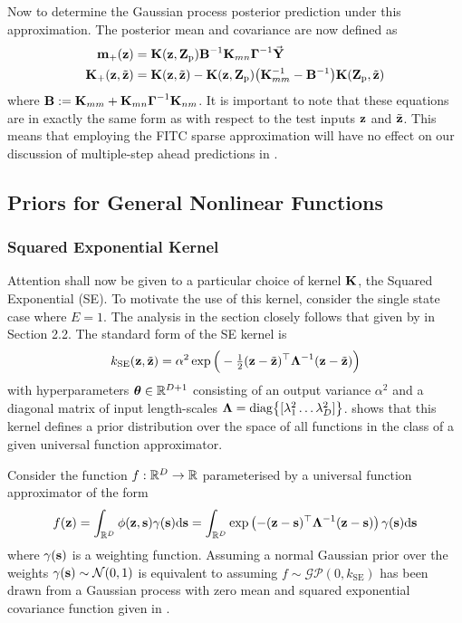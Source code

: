 Now to determine the Gaussian process posterior prediction under this approximation. The posterior mean and covariance are now defined as
\begin{align}
\bmm_{+}(\bz) &= \bK(\bz,\bZ_{\text{p}}) \bB\inv \bK_{mn} \bGam\inv \vec\bY \\
%
\bK_{+}(\bz,\tilde\bz) &= \bK(\bz,\tilde\bz) - \bK(\bz,\bZ_{\text{p}}) \big(\bK_{mm}\inv - \bB\inv\big)\bK(\bZ_{\text{p}},\tilde\bz)
\end{align}
where $\mathbf{B} := \mathbf{K}_{mm} + \mathbf{K}_{mn}\boldsymbol{\Gamma}^{-1}\mathbf{K}_{nm}$. It is important to note that these equations are in exactly the same form as  with respect to the test inputs $\mathbf{z}$ and $\tilde{\mathbf{z}}$. This means that employing the FITC sparse approximation will have no effect on our discussion of multiple-step ahead predictions in .





\subsection{Priors for General Nonlinear Functions} \label{sec:kernels}
\subsubsection{Squared Exponential Kernel}

Attention shall now be given to a particular choice of kernel $\mathbf{K}$, the Squared Exponential (SE). 
To motivate the use of this kernel, consider the single state case where $E=1$. The analysis in the section closely follows that given by \cite{Dei09} in Section 2.2. The standard form of the SE kernel is
\begin{equation}
k_{\text{SE}}(\mathbf{z},\tilde{\mathbf{z}}) = \alpha^2 \exp\Big(-\tfrac{1}{2}(\mathbf{z} - \tilde{\mathbf{z}})^\top\boldsymbol{\Lambda}^{-1}(\mathbf{z} - \tilde{\mathbf{z}}) \Big)
\label{eqn:SEkernel}
\end{equation}
with hyperparameters $\boldsymbol{\theta} \in \mathbb{R}^{D+1}$ consisting of an output variance $\alpha^2$ and a diagonal matrix of input length-scales $\boldsymbol{\Lambda} = \mathrm{diag}\big\{[\lambda_1^2 \dots \lambda_D^2]\big\}$.  shows that this kernel defines a prior distribution over the space of all functions in the class of a given universal function approximator.

\begin{theo} \label{theo:SEkernel}
Consider the function $f:\mathbb{R}^D \rightarrow \mathbb{R}$ parameterised by a universal function approximator of the form
\begin{equation}
f(\mathbf{z}) = \int_{\mathbb{R}^D}  \phi(\mathbf{z},\mathbf{s}) \gamma(\mathbf{s}) \mathrm{d}\mathbf{s} 
= \int_{\mathbb{R}^D}  \exp\left( -(\mathbf{z}-\mathbf{s})^\top\boldsymbol{\Lambda}^{-1}(\mathbf{z}-\mathbf{s}) \right)  \gamma(\mathbf{s})  \mathrm{d}\mathbf{s}
\label{eqn:universalapp}
\end{equation}
where $\gamma(\mathbf{s})$ is a weighting function. Assuming a normal Gaussian prior over the weights $\gamma(\mathbf{s}) \sim \mathcal{N}(0,1)$ is equivalent to assuming $f \sim \mathcal{GP}(0,k_{\text{SE}})$ has been drawn from a Gaussian process with zero mean and squared exponential covariance function given in .
\spa \end{theo}

